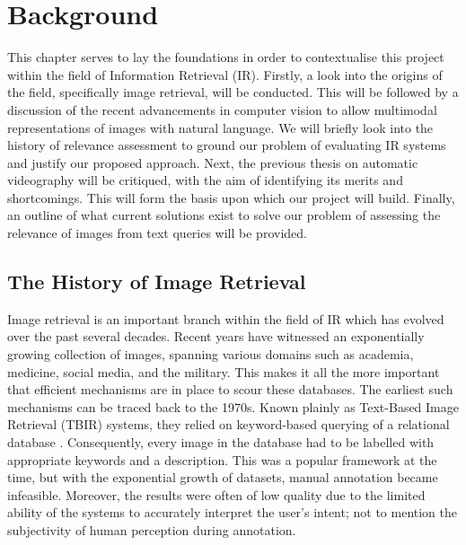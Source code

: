 \documentclass{l4proj}
\begin{document}
\chapter{Background}
This chapter serves to lay the foundations in order to contextualise this project within the field of Information Retrieval (IR). Firstly, a look into the origins of the field, specifically image retrieval, will be conducted. This will be followed by a discussion of the recent advancements in computer vision to allow multimodal representations of images with natural language. We will briefly look into the history of relevance assessment to ground our problem of evaluating IR systems and justify our proposed approach. Next, the previous thesis on automatic videography will be critiqued, with the aim of identifying its merits and shortcomings. This will form the basis upon which our project will build. Finally, an outline of what current solutions exist to solve our problem of assessing the relevance of images from text queries will be provided.

\section{The History of Image Retrieval}
Image retrieval is an important branch within the field of IR which has evolved over the past several decades. Recent years have witnessed an exponentially growing collection of images, spanning various domains such as academia, medicine, social media, and the military. This makes it all the more important that efficient mechanisms are in place to scour these databases. The earliest such mechanisms can be traced back to the 1970s. Known plainly as Text-Based Image Retrieval (TBIR) systems, they relied on keyword-based querying of a relational database \citep{chang1979tbir}. Consequently, every image in the database had to be labelled with appropriate keywords and a description. This was a popular framework at the time, but with the exponential growth of datasets, manual annotation became infeasible. Moreover, the results were often of low quality due to the limited ability of the systems to accurately interpret the user's intent; not to mention the subjectivity of human perception during annotation.
\end{document}
